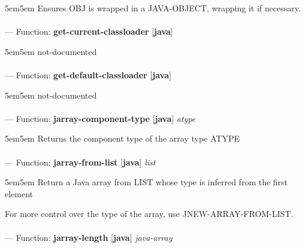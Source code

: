 \begin{adjustwidth}{5em}{5em}
Ensures OBJ is wrapped in a JAVA-OBJECT, wrapping it if necessary.
\end{adjustwidth}

\paragraph{}
\label{JAVA:GET-CURRENT-CLASSLOADER}
--- Function: \textbf{get-current-classloader} [\textbf{java}] \textit{}

\begin{adjustwidth}{5em}{5em}
not-documented
\end{adjustwidth}

\paragraph{}
\label{JAVA:GET-DEFAULT-CLASSLOADER}
--- Function: \textbf{get-default-classloader} [\textbf{java}] \textit{}

\begin{adjustwidth}{5em}{5em}
not-documented
\end{adjustwidth}

\paragraph{}
\label{JAVA:JARRAY-COMPONENT-TYPE}
--- Function: \textbf{jarray-component-type} [\textbf{java}] \textit{atype}

\begin{adjustwidth}{5em}{5em}
Returns the component type of the array type ATYPE
\end{adjustwidth}

\paragraph{}
\label{JAVA:JARRAY-FROM-LIST}
--- Function: \textbf{jarray-from-list} [\textbf{java}] \textit{list}

\begin{adjustwidth}{5em}{5em}
Return a Java array from LIST whose type is inferred from the first element

For more control over the type of the array, use JNEW-ARRAY-FROM-LIST.
\end{adjustwidth}

\paragraph{}
\label{JAVA:JARRAY-LENGTH}
--- Function: \textbf{jarray-length} [\textbf{java}] \textit{java-array}

